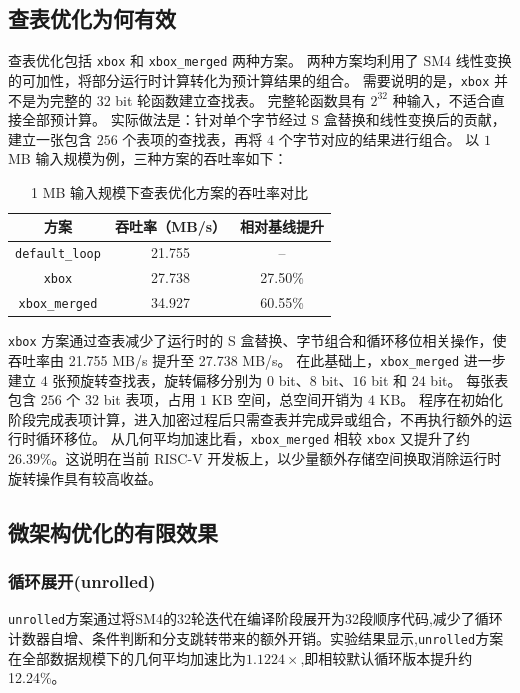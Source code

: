 \subsection{查表优化为何有效} 查表优化包括 \texttt{xbox} 和 \texttt{xbox\_merged} 两种方案。
两种方案均利用了 SM4 线性变换的可加性，将部分运行时计算转化为预计算结果的组合。 
需要说明的是，\texttt{xbox} 并不是为完整的 $32$ bit 轮函数建立查找表。
完整轮函数具有 $2^{32}$ 种输入，不适合直接全部预计算。
实际做法是：针对单个字节经过 S 盒替换和线性变换后的贡献，建立一张包含 $256$ 个表项的查找表，再将 $4$ 个字节对应的结果进行组合。 
以 $1$ MB 输入规模为例，三种方案的吞吐率如下： 
\begin{table}[H] 
    \centering 
    \caption{1 MB 输入规模下查表优化方案的吞吐率对比} 
    \label{tab:xbox-throughput} 
    \begin{tabular}{c|c|c} 
        \toprule 方案 & 吞吐率（MB/s） & 相对基线提升 \\ 
        \midrule \texttt{default\_loop} & 21.755 & -- \\ 
        \texttt{xbox} & 27.738 & 27.50\% \\ 
        \texttt{xbox\_merged} & 34.927 & 60.55\% \\ 
        \bottomrule 
    \end{tabular} 
\end{table} 
        \texttt{xbox} 
        方案通过查表减少了运行时的 S 盒替换、字节组合和循环移位相关操作，使吞吐率由 21.755 MB/s 提升至 27.738 MB/s。 
        在此基础上，\texttt{xbox\_merged} 进一步建立 $4$ 张预旋转查找表，旋转偏移分别为 $0$ bit、$8$ bit、$16$ bit 和 $24$ bit。
        每张表包含 $256$ 个 $32$ bit 表项，占用 $1$ KB 空间，总空间开销为 $4$ KB。
        程序在初始化阶段完成表项计算，进入加密过程后只需查表并完成异或组合，不再执行额外的运行时循环移位。 
        从几何平均加速比看，\texttt{xbox\_merged} 相较 \texttt{xbox} 又提升了约 26.39\%。这说明在当前 RISC-V 开发板上，以少量额外存储空间换取消除运行时旋转操作具有较高收益。

\subsection{微架构优化的有限效果}

\subsubsection{循环展开(unrolled)}

\texttt{unrolled}方案通过将SM4的32轮迭代在编译阶段展开为32段顺序代码,减少了循环计数器自增、条件判断和分支跳转带来的额外开销。实验结果显示,\texttt{unrolled}方案在全部数据规模下的几何平均加速比为$1.1224\times$,即相较默认循环版本提升约12.24\%。

